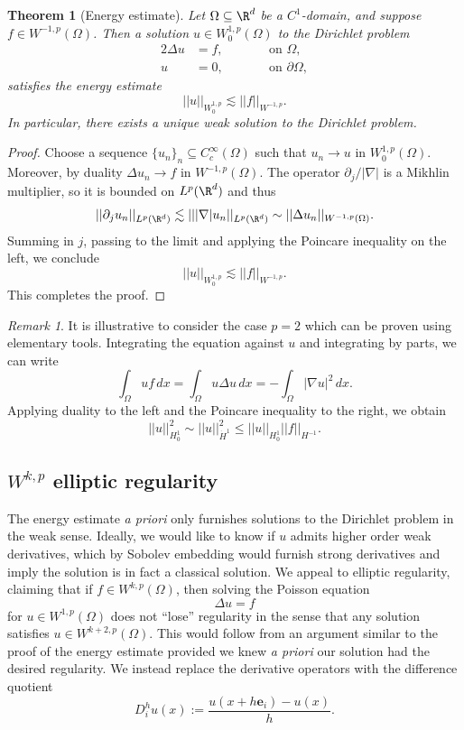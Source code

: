 \documentclass[reqno]{amsart}
\newtheorem{theorem}{Theorem}
\theoremstyle{definition}
\theoremstyle{remark}
\newtheorem*{remark}{Remark}
\let\vec\mathbf
\begin{document}
\begin{theorem}[Energy estimate]
	Let $\Omega \subseteq \R^d$ be a $C^1$-domain, and suppose $f \in W^{-1,p} (\Omega)$. Then a solution $u \in W^{1, p}_0 (\Omega)$ to the Dirichlet problem
		\begin{alignat*}{2}
		\Delta u
			&= f, \qquad  && \text{on } \Omega, \\
		u
			&= 0,	\qquad && \text{on } \partial \Omega,
	\end{alignat*} 
	satisfies the energy estimate
		\[ || u||_{W^{1, p}_0} \lesssim || f ||_{W^{-1, p}}. \]
	In particular, there exists a unique weak solution to the Dirichlet problem. 	
\end{theorem}

\begin{proof}
	Choose a sequence $\{ u_n \}_n \subseteq C^\infty_c (\Omega)$ such that $u_n \to u$ in $W^{1 ,p}_0 (\Omega)$. Moreover, by duality $\Delta u_n \to f$ in $W^{-1, p} (\Omega)$. The operator $\partial_j/|\nabla|$ is a Mikhlin multiplier, so it is bounded on $L^p (\R^d)$ and thus
		\[ || \partial_j u_n ||_{L^p (\R^d)} \lesssim || |\nabla| u_n||_{L^p (\R^d)} \sim || \Delta u_n||_{W^{-1, p} (\Omega)} . \]
	Summing in $j$, passing to the limit and applying the Poincare inequality on the left, we conclude
		\[ || u ||_{W^{1, p}_0} \lesssim || f||_{W^{-1, p}}. \]	
	This completes the proof. 	
\end{proof}

\begin{remark}
	It is illustrative to consider the case $p = 2$ which can be proven using elementary tools. Integrating the equation against $u$ and integrating by parts, we can write
		\[ \int_\Omega u f \, dx = \int_\Omega u \Delta u \, dx = - \int_\Omega |\nabla u|^2 \, dx. \]
	Applying duality to the left and the Poincare inequality to the right, we obtain
		\[ ||u||_{H^1_0}^2 \sim ||u||_{\dot H^1}^2 \leq || u ||_{H^1_0} ||f||_{H^{-1}}. \]	
\end{remark}

\subsection{$W^{k, p}$ elliptic regularity}

The energy estimate \textit{a priori} only furnishes solutions to the Dirichlet problem in the weak sense. Ideally, we would like to know if $u$ admits higher order weak derivatives, which by Sobolev embedding would furnish strong derivatives and imply the solution is in fact a classical solution. We appeal to elliptic regularity, claiming that if $f \in W^{k, p} (\Omega)$, then solving the Poisson equation
	\[ \Delta u = f \]
for $u \in W^{1, p} (\Omega)$ does not ``lose'' regularity in the sense that any solution satisfies $u \in W^{k + 2, p} (\Omega)$. This would follow from an argument similar to the proof of the energy estimate provided we knew \textit{a priori} our solution had the desired regularity. We instead replace the derivative operators with the difference quotient
	\[ D^h_i u (x) := \frac{u(x + h \vec e_i) - u(x)}{h}. \]
\end{document}
